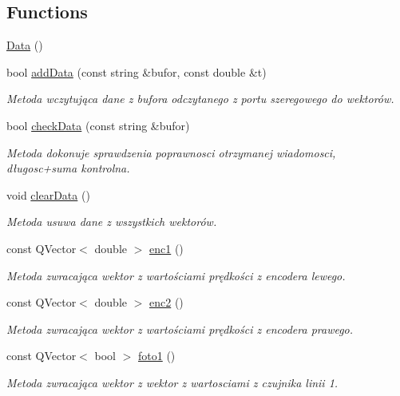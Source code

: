 \subsection*{Functions}
\begin{DoxyCompactItemize}
\item 
\hyperlink{data_8hh_af11f741cb7f587e2e495452a8905a22a}{Data} ()
\item 
bool \hyperlink{data_8hh_a2e824bd41b28fb23a8b6c90b285777ca}{add\+Data} (const string \&bufor, const double \&t)
\begin{DoxyCompactList}\small\item\em Metoda wczytująca dane z bufora odczytanego z portu szeregowego do wektorów. \end{DoxyCompactList}\item 
bool \hyperlink{data_8hh_ad9b327ea613fc268b8a669b6747aa16e}{check\+Data} (const string \&bufor)
\begin{DoxyCompactList}\small\item\em Metoda dokonuje sprawdzenia poprawnosci otrzymanej wiadomosci, długosc+suma kontrolna. \end{DoxyCompactList}\item 
void \hyperlink{data_8hh_a644ad8f01a05ab5e995ebc613b2fcab9}{clear\+Data} ()
\begin{DoxyCompactList}\small\item\em Metoda usuwa dane z wszystkich wektorów. \end{DoxyCompactList}\item 
const Q\+Vector$<$ double $>$ \hyperlink{data_8hh_a3d947897026adac2eb1b5366c9fe357d}{enc1} ()
\begin{DoxyCompactList}\small\item\em Metoda zwracająca wektor z wartościami prędkości z encodera lewego. \end{DoxyCompactList}\item 
const Q\+Vector$<$ double $>$ \hyperlink{data_8hh_a69f1ba0751afcb88bf83a5bab2118f5e}{enc2} ()
\begin{DoxyCompactList}\small\item\em Metoda zwracająca wektor z wartościami prędkości z encodera prawego. \end{DoxyCompactList}\item 
const Q\+Vector$<$ bool $>$ \hyperlink{data_8hh_a4eec6f2ba7baf647e01bd13dbdeac128}{foto1} ()
\begin{DoxyCompactList}\small\item\em Metoda zwracająca wektor z wektor z wartosciami z czujnika linii 1. \end{DoxyCompactList}\item 

\end{DoxyCompactItemize}

